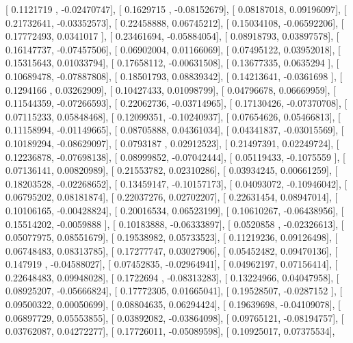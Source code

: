 \documentclass{article}
\begin{document}
       [ 0.1121719 , -0.02470747],
       [ 0.1629715 , -0.08152679],
       [ 0.08187018,  0.09196097],
       [ 0.21732641, -0.03352573],
       [ 0.22458888,  0.06745212],
       [ 0.15034108, -0.06592206],
       [ 0.17772493,  0.0341017 ],
       [ 0.23461694, -0.05884054],
       [ 0.08918793,  0.03897578],
       [ 0.16147737, -0.07457506],
       [ 0.06902004,  0.01166069],
       [ 0.07495122,  0.03952018],
       [ 0.15315643,  0.01033794],
       [ 0.17658112, -0.00631508],
       [ 0.13677335,  0.0635294 ],
       [ 0.10689478, -0.07887808],
       [ 0.18501793,  0.08839342],
       [ 0.14213641, -0.0361698 ],
       [ 0.1294166 ,  0.03262909],
       [ 0.10427433,  0.01098799],
       [ 0.04796678,  0.06669959],
       [ 0.11544359, -0.07266593],
       [ 0.22062736, -0.03714965],
       [ 0.17130426, -0.07370708],
       [ 0.07115233,  0.05848468],
       [ 0.12099351, -0.10240937],
       [ 0.07654626,  0.05466813],
       [ 0.11158994, -0.01149665],
       [ 0.08705888,  0.04361034],
       [ 0.04341837, -0.03015569],
       [ 0.10189294, -0.08629097],
       [ 0.0793187 ,  0.02912523],
       [ 0.21497391,  0.02249724],
       [ 0.12236878, -0.07698138],
       [ 0.08999852, -0.07042444],
       [ 0.05119433, -0.1075559 ],
       [ 0.07136141,  0.00820989],
       [ 0.21553782,  0.02310286],
       [ 0.03934245,  0.00661259],
       [ 0.18203528, -0.02268652],
       [ 0.13459147, -0.10157173],
       [ 0.04093072, -0.10946042],
       [ 0.06795202,  0.08181874],
       [ 0.22037276,  0.02702207],
       [ 0.22631454,  0.08947014],
       [ 0.10106165, -0.00428824],
       [ 0.20016534,  0.06523199],
       [ 0.10610267, -0.06438956],
       [ 0.15514202, -0.0059888 ],
       [ 0.10183888, -0.06333897],
       [ 0.0520858 , -0.02326613],
       [ 0.05077975,  0.08551679],
       [ 0.19538982,  0.05733523],
       [ 0.11219236,  0.09126498],
       [ 0.06748483,  0.08313785],
       [ 0.17277747,  0.03027906],
       [ 0.05452482,  0.09470136],
       [ 0.147919  , -0.04588027],
       [ 0.07452835, -0.02964941],
       [ 0.04962197,  0.07156414],
       [ 0.22648483,  0.09948028],
       [ 0.1722694 , -0.08313283],
       [ 0.13224966,  0.04047958],
       [ 0.08925207, -0.05666824],
       [ 0.17772305,  0.01665041],
       [ 0.19528507, -0.0287152 ],
       [ 0.09500322,  0.00050699],
       [ 0.08804635,  0.06294424],
       [ 0.19639698, -0.04109078],
       [ 0.06897729,  0.05553855],
       [ 0.03892082, -0.03864098],
       [ 0.09765121, -0.08194757],
       [ 0.03762087,  0.04272277],
       [ 0.17726011, -0.05089598],
       [ 0.10925017,  0.07375534],
\end{document}

